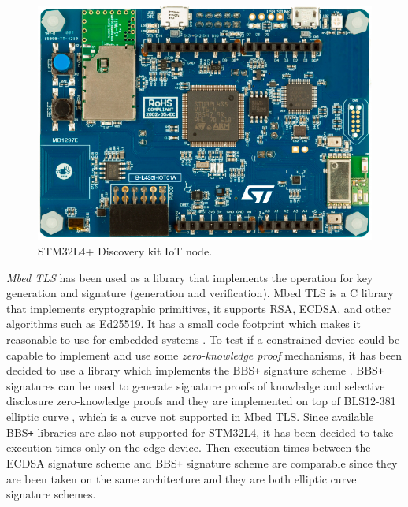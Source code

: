 \begin{figure}[h!]
    \centering
    \includegraphics[scale=0.30]{./chapters/images/STM32L4+ Discovery kit IoT node.jpeg}
    \caption{STM32L4+ Discovery kit IoT node\cite{stm32-board-product}.}
    \label{stm-board}
\end{figure}

\textit{Mbed TLS} has been used as a library that implements the operation for key generation and signature (generation and verification). Mbed TLS is a C library that implements cryptographic primitives, it supports RSA, ECDSA, and other algorithms such as Ed25519. It has a small code footprint which makes it reasonable to use for embedded systems \cite{mbed-tls}. To test if a constrained device could be capable to implement and use some \textit{zero-knowledge proof} mechanisms, it has been decided to use a library which implements the BBS\texttt{+} signature scheme \cite{bbsplus}. BBS\texttt{+} signatures can be used to generate signature proofs of knowledge and selective disclosure zero-knowledge proofs \cite{bbs-rust} and they are implemented on top of BLS12-381 elliptic curve \cite{bls-curve}, which is a curve not supported in Mbed TLS. Since available BBS\texttt{+} libraries are also not supported for STM32L4, it has been decided to take execution times only on the edge device. Then execution times between the ECDSA signature scheme and BBS\texttt{+} signature scheme are comparable since they are been taken on the same architecture and they are both elliptic curve signature schemes.

